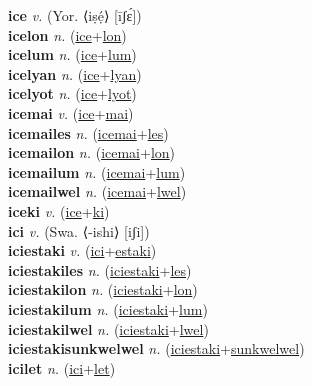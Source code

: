 \textbf{ice} \textit{v.} (Yor. ⟨iṣẹ́⟩ [īʃɛ́])
 \label{ice} \\
\textbf{icelon} \textit{n.} (\hyperref[ice]{ice}+\hyperref[lon]{lon})
 \label{icelon} \\
\textbf{icelum} \textit{n.} (\hyperref[ice]{ice}+\hyperref[lum]{lum})
 \label{icelum} \\
\textbf{icelyan} \textit{n.} (\hyperref[ice]{ice}+\hyperref[lyan]{lyan})
 \label{icelyan} \\
\textbf{icelyot} \textit{n.} (\hyperref[ice]{ice}+\hyperref[lyot]{lyot})
 \label{icelyot} \\
\textbf{icemai} \textit{v.} (\hyperref[ice]{ice}+\hyperref[mai]{mai})
 \label{icemai} \\
\textbf{icemailes} \textit{n.} (\hyperref[icemai]{icemai}+\hyperref[les]{les})
 \label{icemailes} \\
\textbf{icemailon} \textit{n.} (\hyperref[icemai]{icemai}+\hyperref[lon]{lon})
 \label{icemailon} \\
\textbf{icemailum} \textit{n.} (\hyperref[icemai]{icemai}+\hyperref[lum]{lum})
 \label{icemailum} \\
\textbf{icemailwel} \textit{n.} (\hyperref[icemai]{icemai}+\hyperref[lwel]{lwel})
 \label{icemailwel} \\
\textbf{iceki} \textit{v.} (\hyperref[ice]{ice}+\hyperref[ki]{ki})
 \label{iceki} \\
\textbf{ici} \textit{v.} (Swa. ⟨-ishi⟩ [iʃi])
 \label{ici} \\
\textbf{iciestaki} \textit{v.} (\hyperref[ici]{ici}+\hyperref[estaki]{estaki})
 \label{iciestaki} \\
\textbf{iciestakiles} \textit{n.} (\hyperref[iciestaki]{iciestaki}+\hyperref[les]{les})
 \label{iciestakiles} \\
\textbf{iciestakilon} \textit{n.} (\hyperref[iciestaki]{iciestaki}+\hyperref[lon]{lon})
 \label{iciestakilon} \\
\textbf{iciestakilum} \textit{n.} (\hyperref[iciestaki]{iciestaki}+\hyperref[lum]{lum})
 \label{iciestakilum} \\
\textbf{iciestakilwel} \textit{n.} (\hyperref[iciestaki]{iciestaki}+\hyperref[lwel]{lwel})
 \label{iciestakilwel} \\
\textbf{iciestakisunkwelwel} \textit{n.} (\hyperref[iciestaki]{iciestaki}+\hyperref[sunkwelwel]{sunkwelwel})
 \label{iciestakisunkwelwel} \\
\textbf{icilet} \textit{n.} (\hyperref[ici]{ici}+\hyperref[let]{let})
 \label{icilet} \\
